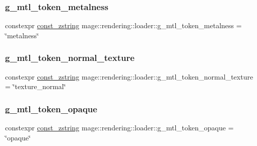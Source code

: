 \hypertarget{namespacemage_1_1rendering_1_1loader_a17bfd9071437318629c792d38ca71808}{}\label{namespacemage_1_1rendering_1_1loader_a17bfd9071437318629c792d38ca71808} 
\subsubsection{\texorpdfstring{g\+\_\+mtl\+\_\+token\+\_\+metalness}{g\_mtl\_token\_metalness}}
{\footnotesize\ttfamily constexpr \hyperlink{namespacemage_abfd9206dc607ceb5d13ec68bf075a5c0}{const\+\_\+zstring} mage\+::rendering\+::loader\+::g\+\_\+mtl\+\_\+token\+\_\+metalness = \char`\"{}metalness\char`\"{}}

\hypertarget{namespacemage_1_1rendering_1_1loader_afa917f0393f16f0fec40ad5d85aa65f9}{}\label{namespacemage_1_1rendering_1_1loader_afa917f0393f16f0fec40ad5d85aa65f9} 
\subsubsection{\texorpdfstring{g\+\_\+mtl\+\_\+token\+\_\+normal\+\_\+texture}{g\_mtl\_token\_normal\_texture}}
{\footnotesize\ttfamily constexpr \hyperlink{namespacemage_abfd9206dc607ceb5d13ec68bf075a5c0}{const\+\_\+zstring} mage\+::rendering\+::loader\+::g\+\_\+mtl\+\_\+token\+\_\+normal\+\_\+texture = \char`\"{}texture\+\_\+normal\char`\"{}}

\hypertarget{namespacemage_1_1rendering_1_1loader_a6f5ffd9bd3336fb8589c59a322ca2b1e}{}\label{namespacemage_1_1rendering_1_1loader_a6f5ffd9bd3336fb8589c59a322ca2b1e} 
\subsubsection{\texorpdfstring{g\+\_\+mtl\+\_\+token\+\_\+opaque}{g\_mtl\_token\_opaque}}
{\footnotesize\ttfamily constexpr \hyperlink{namespacemage_abfd9206dc607ceb5d13ec68bf075a5c0}{const\+\_\+zstring} mage\+::rendering\+::loader\+::g\+\_\+mtl\+\_\+token\+\_\+opaque = \char`\"{}opaque\char`\"{}}

